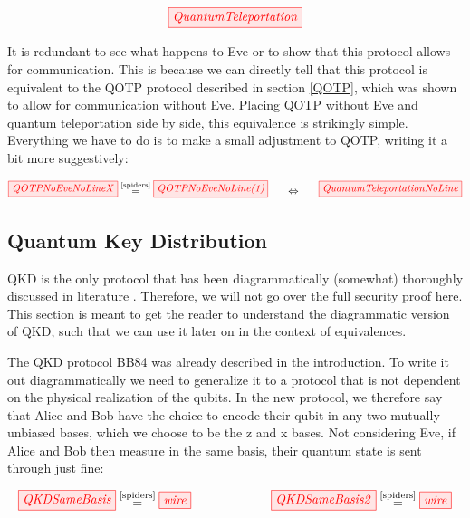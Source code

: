 \documentclass[]{article}
\newcommand{\equaltext}[1]{\ensuremath{\stackrel{\text{#1}}{=}}}
\begin{document}
\begin{equation}
	\label{equation:quantumteleportation}
	\tikzfig{QuantumTeleportation}
\end{equation}
 
It is redundant to see what happens to Eve or to show that this protocol allows for communication. This is because we can directly tell that this protocol is equivalent to the QOTP protocol described in section \ref{QOTP}, which was shown to allow for communication without Eve. Placing QOTP without Eve and quantum teleportation side by side, this equivalence is strikingly simple. Everything we have to do is to make a small adjustment to QOTP, writing it a bit more suggestively:

\begin{equation}
\label{equation:QOTPQuantumTeleportationEquivalence}
\tikzfig{QOTPNoEveNoLineX} \equaltext{\ref{spiders}} \tikzfig{QOTPNoEveNoLine(1)}~~~~~ \Leftrightarrow ~~~~~\tikzfig{QuantumTeleportationNoLine}
\end{equation}
 
\subsection{Quantum Key Distribution}

\label{QuantumKeyDistribution}

QKD is the only protocol that has been diagrammatically (somewhat) thoroughly discussed in literature \cite{Kissinger2017}. Therefore, we will not go over the full security proof here. This section is meant to get the reader to understand the diagrammatic version of QKD, such that we can use it later on in the context of equivalences.

The QKD protocol BB84 was already described in the introduction. To write it out diagrammatically we need to generalize it to a protocol that is not dependent on the physical realization of the qubits. In the new protocol, we therefore say that Alice and Bob have the choice to encode their qubit in any two mutually unbiased bases, which we choose to be the z and x bases. Not considering Eve, if Alice and Bob then measure in the same basis, their quantum state is sent through just fine:

\begin{equation}
	\tikzfig{QKDSameBasis} \equaltext{\ref{spiders}} \tikzfig{wire} ~~~~~~~~~~~~~~~~~~~ \tikzfig{QKDSameBasis2} \equaltext{\ref{spiders}} \tikzfig{wire}
\end{equation}
\end{document}
